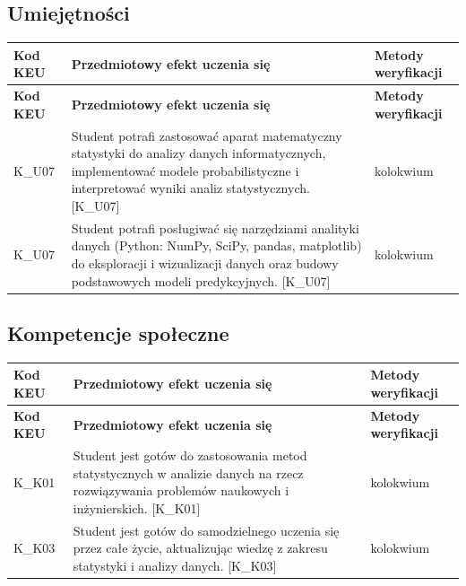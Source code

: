 \documentclass[12pt, a4paper]{article}
\newcommand{\thdrule}{\noalign{\global\setlength{\extrarowheight}{0pt}}}
\newcommand{\thdend}{\noalign{\global\setlength{\extrarowheight}{3pt}}}
\begin{document}
\subsection*{Umiejętności}
{\scriptsize
\begin{longtable}{m{1.6cm}m{9.0cm}m{4.2cm}}
\thdrule\toprule
\rowcolor{pjatkRed} {\color{white}\footnotesize\textbf{\vphantom{Ag}Kod KEU}} & {\color{white}\footnotesize\textbf{\vphantom{Ag}Przedmiotowy efekt uczenia się}} & {\color{white}\footnotesize\textbf{\vphantom{Ag}Metody weryfikacji}} \\
\midrule\thdend
\endfirsthead
\thdrule\toprule
\rowcolor{pjatkRed} {\color{white}\footnotesize\textbf{\vphantom{Ag}Kod KEU}} & {\color{white}\footnotesize\textbf{\vphantom{Ag}Przedmiotowy efekt uczenia się}} & {\color{white}\footnotesize\textbf{\vphantom{Ag}Metody weryfikacji}} \\
\midrule\thdend
\endhead
  \rowcolor{tableRowLight} K\_U07 & Student potrafi zastosować aparat matematyczny statystyki do analizy danych informatycznych, implementować modele probabilistyczne i interpretować wyniki analiz statystycznych. {[}K\_U07{]} & kolokwium \\
  \rowcolor{tableRowAlt} K\_U07 & Student potrafi posługiwać się narzędziami analityki danych (Python: NumPy, SciPy, pandas, matplotlib) do eksploracji i wizualizacji danych oraz budowy podstawowych modeli predykcyjnych. {[}K\_U07{]} & kolokwium \\
\bottomrule
\end{longtable}}

\subsection*{Kompetencje społeczne}
{\scriptsize
\begin{longtable}{m{1.6cm}m{9.0cm}m{4.2cm}}
\thdrule\toprule
\rowcolor{pjatkRed} {\color{white}\footnotesize\textbf{\vphantom{Ag}Kod KEU}} & {\color{white}\footnotesize\textbf{\vphantom{Ag}Przedmiotowy efekt uczenia się}} & {\color{white}\footnotesize\textbf{\vphantom{Ag}Metody weryfikacji}} \\
\midrule\thdend
\endfirsthead
\thdrule\toprule
\rowcolor{pjatkRed} {\color{white}\footnotesize\textbf{\vphantom{Ag}Kod KEU}} & {\color{white}\footnotesize\textbf{\vphantom{Ag}Przedmiotowy efekt uczenia się}} & {\color{white}\footnotesize\textbf{\vphantom{Ag}Metody weryfikacji}} \\
\midrule\thdend
\endhead
  \rowcolor{tableRowLight} K\_K01 & Student jest gotów do zastosowania metod statystycznych w analizie danych na rzecz rozwiązywania problemów naukowych i inżynierskich. {[}K\_K01{]} & kolokwium \\
  \rowcolor{tableRowAlt} K\_K03 & Student jest gotów do samodzielnego uczenia się przez całe życie, aktualizując wiedzę z zakresu statystyki i analizy danych. {[}K\_K03{]} & kolokwium \\
\bottomrule
\end{longtable}}
\end{document}
